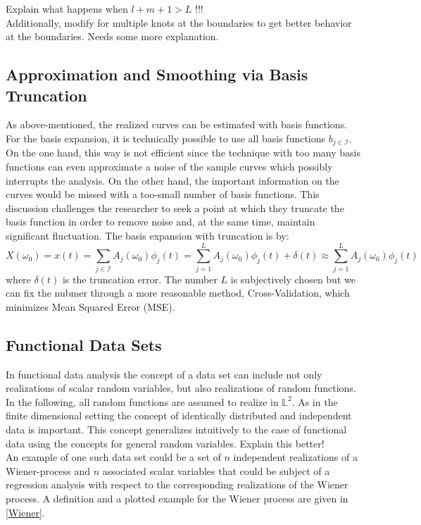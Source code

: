 \documentclass[11pt,twoside,a4paper]{article}
\begin{document}
	{\color{red}Explain what happens when $l+m+1 > L$ !!!\\
		Additionally, modify for multiple knots at the boundaries to get better behavior at the boundaries. Needs some more explanation.}	
	
	\subsection{Approximation and Smoothing via Basis Truncation}
	As above-mentioned, the realized curves can be estimated with basis functions. For the basis expansion, it is technically possible to use all basis functions $b_{j \in \mathcal{I}}$. On the one hand, this way is not efficient since the technique with too many basis functions can even approximate a noise of the sample curves which possibly interrupts the analysis. On the other hand, the important information on the curves would be missed with a too-small number of basis functions. This discussion challenges the researcher to seek a point at which they truncate the basis function in order to remove noise and, at the same time, maintain significant fluctuation. The basis expansion with truncation is by:
	\begin{equation}
		X(\omega_0) = x(t) = \sum_{j \in \mathcal{I}} A_j(\omega_0) \phi_j(t) = \sum_{j = 1}^{L} A_j(\omega_0) \phi_j(t) + \delta(t) \approx \sum_{j = 1}^{L} A_j(\omega_0) \phi_j(t)
	\end{equation}
	where $\delta(t)$ is the truncation error. The number $L$ is subjectively chosen but we can fix the nubmer through a more reasonable method, Cross-Validation, which minimizes Mean Squared Error (MSE). 
	
	\subsection{Functional Data Sets}
	In functional data analysis the concept of a data set can include not only realizations of scalar random variables, but also realizations of random functions. In the following, all random functions are assumed to realize in $\mathbb{L}^2$. As in the finite dimensional setting the concept of identically distributed and independent data is important. This concept generalizes intuitively to the case of functional data using the concepts for general random variables. {\color{red} Explain this better!}\\
	An example of one such data set could be a set of $n$ independent realizations of a Wiener-process and $n$ associated scalar variables that could be subject of a regression analysis with respect to the corresponding realizations of the Wiener process. A definition and a plotted example for the Wiener process are given in \ref{Wiener}.
	
\end{document}
